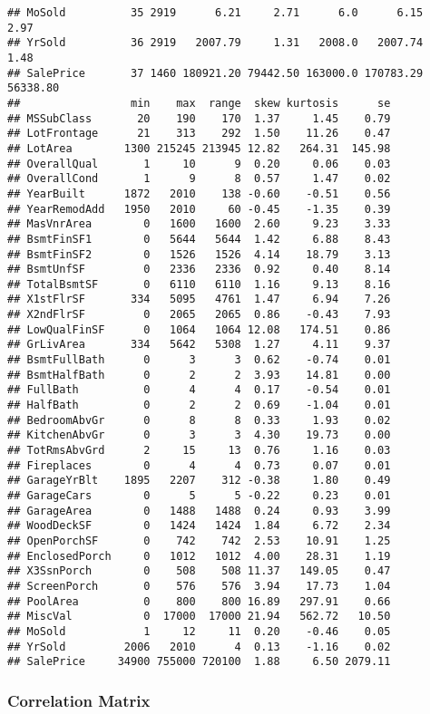 \documentclass[]{article}
\begin{document}
\begin{verbatim}
## MoSold          35 2919      6.21     2.71      6.0      6.15     2.97
## YrSold          36 2919   2007.79     1.31   2008.0   2007.74     1.48
## SalePrice       37 1460 180921.20 79442.50 163000.0 170783.29 56338.80
##                 min    max  range  skew kurtosis      se
## MSSubClass       20    190    170  1.37     1.45    0.79
## LotFrontage      21    313    292  1.50    11.26    0.47
## LotArea        1300 215245 213945 12.82   264.31  145.98
## OverallQual       1     10      9  0.20     0.06    0.03
## OverallCond       1      9      8  0.57     1.47    0.02
## YearBuilt      1872   2010    138 -0.60    -0.51    0.56
## YearRemodAdd   1950   2010     60 -0.45    -1.35    0.39
## MasVnrArea        0   1600   1600  2.60     9.23    3.33
## BsmtFinSF1        0   5644   5644  1.42     6.88    8.43
## BsmtFinSF2        0   1526   1526  4.14    18.79    3.13
## BsmtUnfSF         0   2336   2336  0.92     0.40    8.14
## TotalBsmtSF       0   6110   6110  1.16     9.13    8.16
## X1stFlrSF       334   5095   4761  1.47     6.94    7.26
## X2ndFlrSF         0   2065   2065  0.86    -0.43    7.93
## LowQualFinSF      0   1064   1064 12.08   174.51    0.86
## GrLivArea       334   5642   5308  1.27     4.11    9.37
## BsmtFullBath      0      3      3  0.62    -0.74    0.01
## BsmtHalfBath      0      2      2  3.93    14.81    0.00
## FullBath          0      4      4  0.17    -0.54    0.01
## HalfBath          0      2      2  0.69    -1.04    0.01
## BedroomAbvGr      0      8      8  0.33     1.93    0.02
## KitchenAbvGr      0      3      3  4.30    19.73    0.00
## TotRmsAbvGrd      2     15     13  0.76     1.16    0.03
## Fireplaces        0      4      4  0.73     0.07    0.01
## GarageYrBlt    1895   2207    312 -0.38     1.80    0.49
## GarageCars        0      5      5 -0.22     0.23    0.01
## GarageArea        0   1488   1488  0.24     0.93    3.99
## WoodDeckSF        0   1424   1424  1.84     6.72    2.34
## OpenPorchSF       0    742    742  2.53    10.91    1.25
## EnclosedPorch     0   1012   1012  4.00    28.31    1.19
## X3SsnPorch        0    508    508 11.37   149.05    0.47
## ScreenPorch       0    576    576  3.94    17.73    1.04
## PoolArea          0    800    800 16.89   297.91    0.66
## MiscVal           0  17000  17000 21.94   562.72   10.50
## MoSold            1     12     11  0.20    -0.46    0.05
## YrSold         2006   2010      4  0.13    -1.16    0.02
## SalePrice     34900 755000 720100  1.88     6.50 2079.11
\end{verbatim}

\subsubsection{Correlation Matrix}\label{correlation-matrix}
\end{document}
